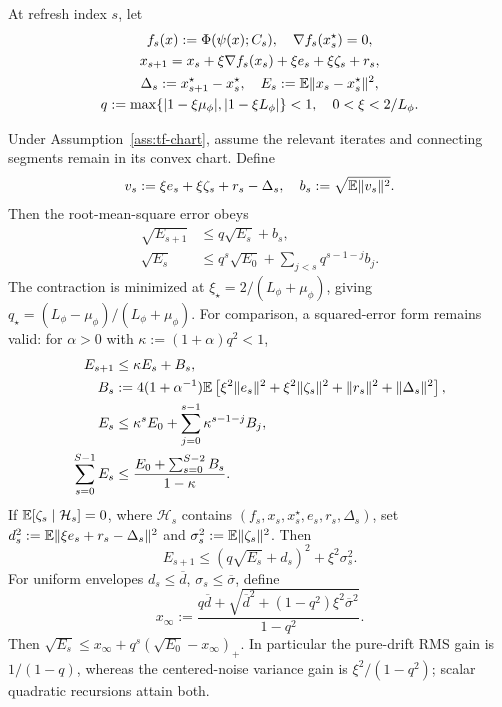 \begin{definition}
At refresh index $s$, let
\begin{gather}
 f_s(x):=\Phi(\psi(x);C_s),\quad \nabla f_s(x_s^\star)=0,\\
 x_{s+1}=x_s+\xi\nabla f_s(x_s)+\xi e_s+\xi\zeta_s+r_s,\\
 \Delta_s:=x_{s+1}^\star-x_s^\star,\quad
 E_s:=\mathbb E\|x_s-x_s^\star\|^2,\\
 q:=\max\{|1-\xi\mu_\phi|,|1-\xi L_\phi|\}<1,\quad0<\xi<2/L_\phi.
\end{gather}
\end{definition}
\begin{theorem}\label{thm:tf-tracking}
Under Assumption~\ref{ass:tf-chart}, assume the relevant iterates and connecting
segments remain in its convex chart. Define
\begin{gather}
 v_s:=\xi e_s+\xi\zeta_s+r_s-\Delta_s,\quad
 b_s:=\sqrt{\mathbb E\|v_s\|^2}.
\end{gather}
Then the root-mean-square error obeys
\begin{align}
 \sqrt{E_{s+1}}&\le q\sqrt{E_s}+b_s,\\
 \sqrt{E_s}&\le q^s\sqrt{E_0}+\sum_{j<s}q^{s-1-j}b_j.
 \label{eq:tracking-rms-sharp}
\end{align}
The contraction is minimized at
$\xi_\star=2/(L_\phi+\mu_\phi)$, giving
$q_\star=(L_\phi-\mu_\phi)/(L_\phi+\mu_\phi)$.
For comparison, a squared-error form remains valid: for $\alpha>0$ with
$\kappa:=(1+\alpha)q^2<1$,
\begin{align}
 E_{s+1}&\le\kappa E_s+B_s,\\
 B_s&:=4(1+\alpha^{-1})\mathbb E\left[
       \xi^2\|e_s\|^2+\xi^2\|\zeta_s\|^2+\|r_s\|^2+\|\Delta_s\|^2\right],\\
 E_s&\le\kappa^s E_0+\sum_{j=0}^{s-1}\kappa^{s-1-j}B_j,
 \label{eq:tf-tracking-expanded}\\
 \sum_{s=0}^{S-1}E_s&\le\frac{E_0+\sum_{s=0}^{S-2}B_s}{1-\kappa}.
\end{align}
If $\mathbb E[\zeta_s\mid\mathcal H_s]=0$, where $\mathcal H_s$ contains
$(f_s,x_s,x_s^\star,e_s,r_s,\Delta_s)$, set
$d_s^2:=\mathbb E\|\xi e_s+r_s-\Delta_s\|^2$ and
$\sigma_s^2:=\mathbb E\|\zeta_s\|^2$. Then
\begin{equation}
 E_{s+1}\le(q\sqrt{E_s}+d_s)^2+\xi^2\sigma_s^2.
\end{equation}
For uniform envelopes $d_s\le\overline d$, $\sigma_s\le\overline\sigma$, define
\begin{equation}
 x_\infty:=\frac{q\overline d+
      \sqrt{\overline d^2+(1-q^2)\xi^2\overline\sigma^2}}{1-q^2}.
\end{equation}
Then $\sqrt{E_s}\le x_\infty+q^s(\sqrt{E_0}-x_\infty)_+$.
In particular the pure-drift RMS gain is $1/(1-q)$, whereas the centered-noise
variance gain is $\xi^2/(1-q^2)$; scalar quadratic recursions attain both.
\end{theorem}
